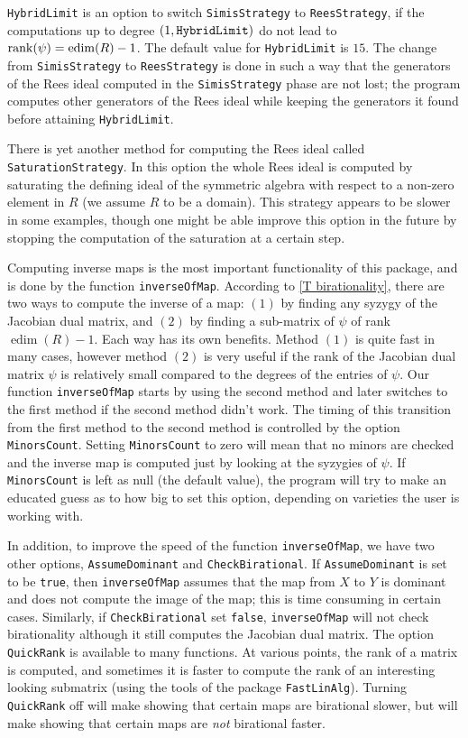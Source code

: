 \documentclass[11pt]{amsart}
\numberwithin{equation}{theorem}
\renewcommand{\:}{\colon}
\DeclareMathOperator{\edim}{edim}
\theoremstyle{theorem}
\begin{document}
{\tt HybridLimit} is an option to switch   {\tt SimisStrategy} to  {\tt{ReesStrategy}}, if the computations up to degree $(1, \tt{HybridLimit})$ do not lead to   ${\rm rank}(\psi)=\edim(R)-1$.
The default value for {\tt HybridLimit} is $15$. The change from  {\tt SimisStrategy} to  {\tt ReesStrategy} is done in such a way that the generators of the Rees ideal computed in the { \tt SimisStrategy} phase are not lost; the program computes other generators of the Rees ideal while keeping the generators it found before attaining {\tt HybridLimit}.

There is yet another method for computing the Rees ideal called {\tt SaturationStrategy}. In this option the whole Rees ideal is computed by saturating the defining ideal of the symmetric algebra with respect to a non-zero element in $R$ (we assume $R$ to be a domain). This strategy appears to be slower in some examples, though one might be able improve this option in the future by stopping the computation of the saturation at a certain step.

Computing inverse maps is the most important functionality of this package, and is done by the function {\tt inverseOfMap}. According to \autoref{T birationality}, there are two ways to compute the inverse of a map: $(1)$ by finding any syzygy of the Jacobian dual matrix, and $(2)$ by finding a sub-matrix of $\psi$ of rank $\edim(R)-1$. Each way has its own benefits. Method $(1)$ is quite fast in many cases, however method $(2)$ is very useful if the rank of the Jacobian dual matrix  $\psi$ is relatively small compared to the degrees of the entries of $\psi$. Our function {\tt inverseOfMap} starts by using the second method and later switches to the first method if the second method didn't work.  The timing of this transition from the first method to the second method is controlled by the option {\tt MinorsCount}. Setting {\tt MinorsCount} to zero will mean that no minors are checked and the inverse map is computed just by looking at the syzygies of $\psi$.  If {\tt MinorsCount} is left as null (the default value), the program will try to make an educated guess as to how big to set this option, depending on varieties the user is working with.

 In addition, to improve the speed of the function {\tt inverseOfMap}, we have two other options, {\tt AssumeDominant} and {\tt CheckBirational}. If {\tt AssumeDominant} is set  to be {\tt true},  then  {\tt inverseOfMap} assumes that the map from $X$ to $Y$ is dominant and does not compute the image of the map; this is time consuming in certain cases.
 Similarly, if {\tt CheckBirational} set {\tt false}, {\tt inverseOfMap} will  not check birationality although it still computes the Jacobian dual matrix.  The option {\tt QuickRank} is available to many functions.  At various points, the rank of a matrix is computed, and sometimes it is faster to compute the rank of an interesting looking submatrix (using the tools of the package {\tt FastLinAlg}).  Turning {\tt QuickRank} off will make showing that certain maps are birational slower, but will make showing that certain maps are \emph{not} birational faster.
\end{document}
